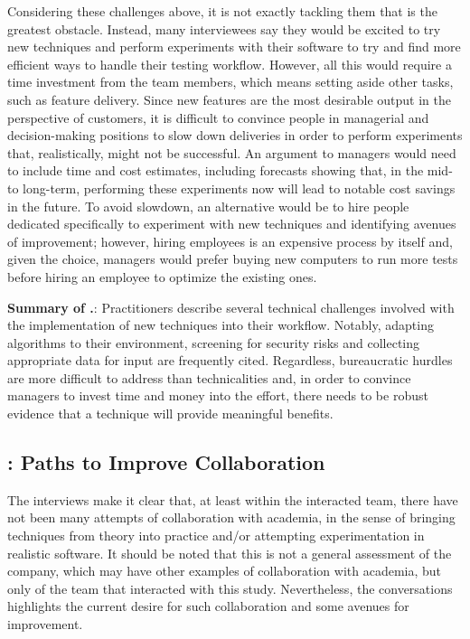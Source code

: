 Considering these challenges above, it is not exactly tackling them that is the greatest obstacle.
Instead, many interviewees say they would be excited to try new techniques and perform experiments with their software to try and find more efficient ways to handle their testing workflow.
However, all this would require a time investment from the team members, which means setting aside other tasks, such as feature delivery.
Since new features are the most desirable output in the perspective of customers, it is difficult to convince people in managerial and decision-making positions to slow down deliveries in order to perform experiments that, realistically, might not be successful.
An argument to managers would need to include time and cost estimates, including forecasts showing that, in the mid- to long-term, performing these experiments now will lead to notable cost savings in the future.
To avoid slowdown, an alternative would be to hire people dedicated specifically to experiment with new techniques and identifying avenues of improvement; however, hiring employees is an expensive process by itself and, given the choice, managers would prefer buying new computers to run more tests before hiring an employee to optimize the existing ones.

\begin{tcolorbox}%
\textbf{Summary of .}: 
Practitioners describe several technical challenges involved with the implementation of new techniques into their workflow.
Notably, adapting algorithms to their environment, screening for security risks and collecting appropriate data for input are frequently cited.
Regardless, bureaucratic hurdles are more difficult to address than technicalities and, in order to convince managers to invest time and money into the effort, there needs to be robust evidence that a technique will provide meaningful benefits.
\end{tcolorbox}


\subsection{: Paths to Improve Collaboration}

The interviews make it clear that, at least within the interacted team, there have not been many attempts of collaboration with academia, in the sense of bringing techniques from theory into practice and/or attempting experimentation in realistic software.
It should be noted that this is not a general assessment of the company, which may have other examples of collaboration with academia, but only of the team that interacted with this study.
Nevertheless, the conversations highlights the current desire for such collaboration and some avenues for improvement.

